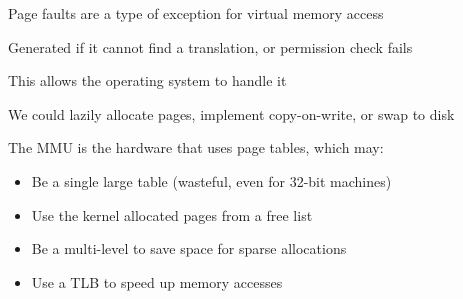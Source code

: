 \begin{slide}


    Page faults are a type of exception for virtual memory access

    \leftspace{}Generated if it cannot find a translation, or permission check fails
    \medskip

    This allows the operating system to handle it

    \leftspace{}We could lazily allocate pages, implement copy-on-write, or swap to disk

\end{slide}

\begin{slide}


    The MMU is the hardware that uses page tables, which may:

    \begin{itemize}
      \item Be a single large table (wasteful, even for 32-bit machines)
      \item Use the kernel allocated pages from a free list
      \item Be a multi-level to save space for sparse allocations
      \item Use a TLB to speed up memory accesses
    \end{itemize}

\end{slide}
  

